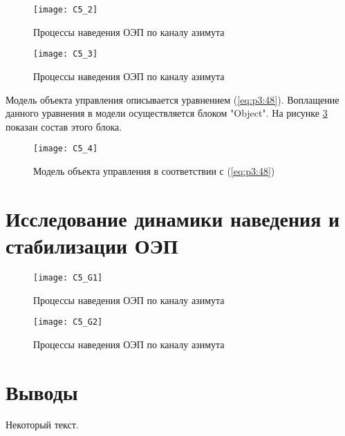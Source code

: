 \begin{figure}[ht]
	\centering
	\texttt{[image: C5\_2]} 
	\caption{Процессы наведения ОЭП по каналу азимута}
	\label{fig:az_true}
\end{figure}

\begin{figure}[ht]
	\centering
	\texttt{[image: C5\_3]} 
	\caption{Процессы наведения ОЭП по каналу азимута}
	\label{fig:az_true}
\end{figure}

 Модель объекта управления описывается уравнением (\ref{eq:p3:48}). Воплащение данного уравнения в модели осуществляется блоком "Object". На рисунке \ref{fig:object} показан состав этого блока.
\begin{figure}[ht]
	\centering
	\texttt{[image: C5\_4]} 
	\caption{Модель объекта управления в соответствии с (\ref{eq:p3:48})}
	\label{fig:object}
\end{figure}



\section{Исследование динамики наведения и стабилизации ОЭП} \label{ch:ch5/sect4}
\begin{figure}[ht]
	\centering
	\texttt{[image: C5\_G1]} 
	\caption{Процессы наведения ОЭП по каналу азимута}
	\label{fig:az_true}
\end{figure}
\begin{figure}[ht]
	\centering
	\texttt{[image: C5\_G2]} 
	\caption{Процессы наведения ОЭП по каналу азимута}
	\label{fig:az_true}
\end{figure}
\section{Выводы} \label{ch:ch5/sect5}
	


Некоторый текст.

\clearpage